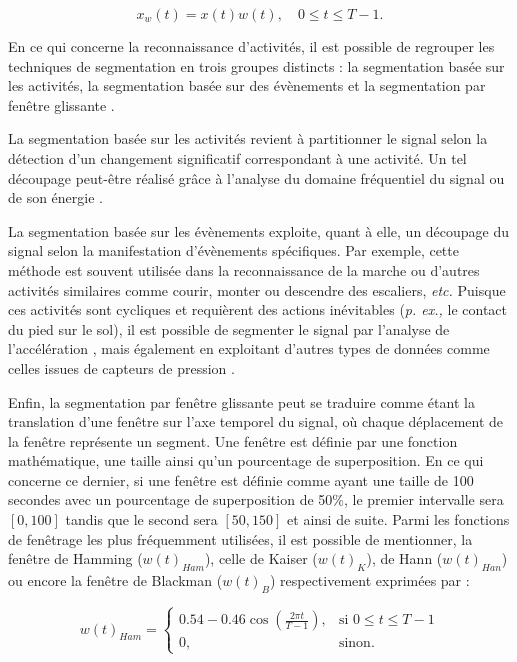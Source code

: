 \begin{equation}
    x_w\left(t\right) = x\left(t\right)w\left(t\right), \quad 0 \leq t \leq T - 1.
\end{equation}

En ce qui concerne la reconnaissance d'activités, il est possible de regrouper les techniques de segmentation en trois groupes distincts : la segmentation basée sur les activités, la segmentation basée sur des évènements et la segmentation par fenêtre glissante \citep{Banos2014}.

La segmentation basée sur les activités revient à partitionner le signal selon la détection d'un changement significatif correspondant à une activité. Un tel découpage peut-être réalisé grâce à l'analyse du domaine fréquentiel du signal ou de son énergie \citep{Sekine2000, Guenterberg2009}.

La segmentation basée sur les évènements exploite, quant à elle, un découpage du signal selon la manifestation d'évènements spécifiques. Par exemple, cette méthode est souvent utilisée dans la reconnaissance de la marche ou d'autres activités similaires comme courir, monter ou descendre des escaliers, \textit{etc. } Puisque ces activités sont cycliques et requièrent des actions inévitables (\textit{p. ex., } le contact du pied sur le sol), il est possible de segmenter le signal par l'analyse de l'accélération \citep{SantAnna2010}, mais également en exploitant d'autres types de données comme celles issues de capteurs de pression \citep{Crea2012}.

Enfin, la segmentation par fenêtre glissante peut se traduire comme étant la translation d'une fenêtre sur l'axe temporel du signal, où chaque déplacement de la fenêtre représente un segment. Une fenêtre est définie par une fonction mathématique, une taille ainsi qu'un pourcentage de superposition. En ce qui concerne ce dernier, si une fenêtre est définie comme ayant une taille de 100 secondes avec un pourcentage de superposition de 50\%, le premier intervalle sera $\left[0,100\right]$ tandis que le second sera $\left[50,150\right]$ et ainsi de suite. Parmi les fonctions de fenêtrage les plus fréquemment utilisées, il est possible de mentionner, la fenêtre de Hamming ($w(t)_{Ham}$), celle de Kaiser ($w(t)_K$), de Hann ($w(t)_{Han}$) ou encore la fenêtre de Blackman ($w(t)_B$) respectivement exprimées par :

\begin{equation}
	\label{eq:hamming}
	w\left(t\right)_{Ham} = \left\{
	\begin{array}{ll}
		0.54-0.46\cos(\frac{2\pi t}{T-1}), & \mbox{si } 0 \leq t \leq T-1 \\
		0,								   & \mbox{sinon.}
	\end{array}
	\right.
\end{equation}

